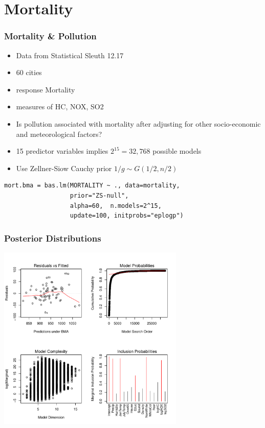 \documentclass[]{beamer}
\begin{document}
\section{Mortality}
\begin{frame}[fragile]
\frametitle{Mortality \& Pollution}
  \begin{itemize}
  \item Data from Statistical Sleuth 12.17 \pause 
  \item 60 cities \pause 
\item response Mortality \pause 
\item measures of HC, NOX, SO2 \pause 
\item Is pollution associated with mortality after adjusting for other
  socio-economic and meteorological factors? \pause 
\item 15 predictor variables implies $2^{15} = 32,768$ possible models
  \pause 
\item Use Zellner-Siow Cauchy prior  $1/g \sim  G(1/2, n/2)$
  \end{itemize}
\begin{verbatim}
mort.bma = bas.lm(MORTALITY ~ ., data=mortality,
                  prior="ZS-null", 
                  alpha=60,  n.models=2^15, 
                  update=100, initprobs="eplogp")
\end{verbatim}
\end{frame}

\begin{frame}\frametitle{Posterior Distributions}
  \includegraphics[height=3.5in]{mort-sum}
\end{frame}
\end{document}
